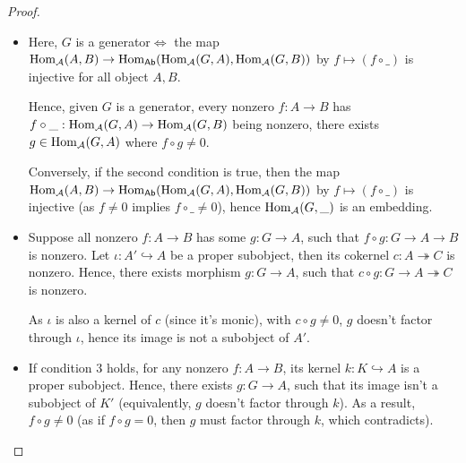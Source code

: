 \documentclass{article}
\begin{document}
\begin{proof}
    
    \hfil

    \begin{itemize}
        \item[$1\iff 2$:] Here, $G$ is a generator$\iff$ the map $\mathrm{Hom}_{\mathcal{A}}(A,B)\rightarrow \mathrm{Hom}_{\mathsf{Ab}}(\mathrm{Hom}_{\mathcal{A}}(G,A),\mathrm{Hom}_{\mathcal{A}}(G,B))$ by $f\mapsto (f\circ \_)$ is injective for all object $A,B$. 
        
        Hence, given $G$ is a generator, every nonzero $f:A\rightarrow B$ has $f\circ\_:\mathrm{Hom}_{\mathcal{A}}(G,A)\rightarrow \mathrm{Hom}_{\mathcal{A}}(G,B)$ being nonzero, there exists $g \in \mathrm{Hom}_{\mathcal{A}}(G,A)$ where $f\circ g\neq 0$.

        Conversely, if the second condition is true, then the map $\mathrm{Hom}_{\mathcal{A}}(A,B)\rightarrow \mathrm{Hom}_{\mathsf{Ab}}(\mathrm{Hom}_{\mathcal{A}}(G,A),\mathrm{Hom}_{\mathcal{A}}(G,B))$ by $f\mapsto( f\circ \_)$ is injective (as $f\neq 0$ implies $f\circ\_\neq 0$), hence $\mathrm{Hom}_\mathcal{A}(G,\_)$ is an embedding.
        
        \hfil

        \item[$2\implies 3$:] Suppose all nonzero $f:A\rightarrow B$ has some $g:G\rightarrow A$, such that $f\circ g:G\rightarrow A\rightarrow B$ is nonzero. Let $\iota:A'\hookrightarrow A$ be a proper subobject, then its cokernel $c:A\twoheadrightarrow C$ is nonzero. Hence, there exists morphism $g:G\rightarrow A$, such that $c\circ g:G\rightarrow A\twoheadrightarrow C$ is nonzero.
        
        As $\iota$ is also a kernel of $c$ (since it's monic), with $c\circ g\neq 0$, $g$ doesn't factor through $\iota$, hence its image is not a subobject of $A'$.

        \hfil

        \item[$2\impliedby 3$:] If condition 3 holds, for any nonzero $f:A\rightarrow B$, its kernel $k:K\hookrightarrow A$ is a proper subobject. Hence, there exists $g:G\rightarrow A$, such that its image isn't a subobject of $K'$ (equivalently, $g$ doesn't factor through $k$). As a result, $f\circ g\neq 0$ (as if $f\circ g=0$, then $g$ must factor through $k$, which contradicts).
    \end{itemize}
\end{proof}
\end{document}
